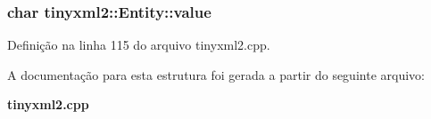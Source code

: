 \subsubsection[{value}]{\setlength{\rightskip}{0pt plus 5cm}char tinyxml2\+::\+Entity\+::value}\label{structtinyxml2_1_1_entity_a7334e81e33b4615655a403711b24f3ed}


Definição na linha 115 do arquivo tinyxml2.\+cpp.



A documentação para esta estrutura foi gerada a partir do seguinte arquivo\+:\begin{DoxyCompactItemize}
\item 
{\bf tinyxml2.\+cpp}\end{DoxyCompactItemize}
